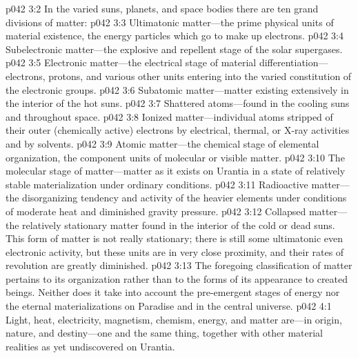 \vs p042 3:2 In the varied suns, planets, and space bodies there are ten grand divisions of matter:
\pc \vs p042 3:3 \bibnobreakspace Ultimatonic matter---the prime physical units of material existence, the energy particles which go to make up electrons.
\pc \vs p042 3:4 \bibnobreakspace Subelectronic matter---the explosive and repellent stage of the solar supergases.
\pc \vs p042 3:5 \bibnobreakspace Electronic matter---the electrical stage of material differentiation---electrons, protons, and various other units entering into the varied constitution of the electronic groups.
\pc \vs p042 3:6 \bibnobreakspace Subatomic matter---matter existing extensively in the interior of the hot suns.
\pc \vs p042 3:7 \bibnobreakspace Shattered atoms---found in the cooling suns and throughout space.
\pc \vs p042 3:8 \bibnobreakspace Ionized matter---individual atoms stripped of their outer (chemically active) electrons by electrical, thermal, or X\hyp{}ray activities and by solvents.
\pc \vs p042 3:9 \bibnobreakspace Atomic matter---the chemical stage of elemental organization, the component units of molecular or visible matter.
\pc \vs p042 3:10 \bibnobreakspace The molecular stage of matter---matter as it exists on Urantia in a state of relatively stable materialization under ordinary conditions.
\pc \vs p042 3:11 \bibnobreakspace Radioactive matter---the disorganizing tendency and activity of the heavier elements under conditions of moderate heat and diminished gravity pressure.
\pc \vs p042 3:12 \bibnobreakspace Collapsed matter---the relatively stationary matter found in the interior of the cold or dead suns. This form of matter is not really stationary; there is still some ultimatonic even electronic activity, but these units are in very close proximity, and their rates of revolution are greatly diminished.
\pc \vs p042 3:13 The foregoing classification of matter pertains to its organization rather than to the forms of its appearance to created beings. Neither does it take into account the pre\hyp{}emergent stages of energy nor the eternal materializations on Paradise and in the central universe.
\vs p042 4:1 Light, heat, electricity, magnetism, chemism, energy, and matter are---in origin, nature, and destiny---one and the same thing, together with other material realities as yet undiscovered on Urantia.
